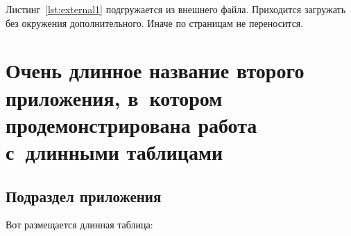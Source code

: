 Листинг~\cref{lst:external1} подгружается из внешнего файла. Приходится
загружать без окружения дополнительного. Иначе по страницам не переносится.
\begingroup
\captiondelim{ } %

\endgroup

\chapter{Очень длинное название второго приложения, в~котором продемонстрирована работа с~длинными таблицами}\label{app:B}

\section{Подраздел приложения}\label{app:B1}
Вот размещается длинная таблица:
\fontsize{10pt}{10pt}\selectfont
